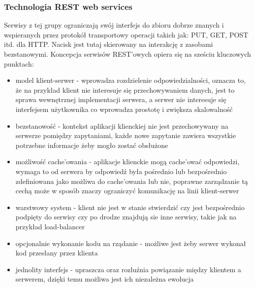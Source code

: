 \subsubsection{Technologia REST web services}
Serwisy z tej grupy \cite{fielding2000} ograniczają swój interfejs do zbioru dobrze znanych i wspieranych przez protokół transportowy operacji takich jak: PUT, GET, POST itd. dla  HTTP. Nacisk jest tutaj skierowany na interakcję z zasobami bezstanowymi. Koncepcja serwisów REST'owych opiera się na sześciu kluczowych punktach:
\begin{itemize}
	\item model klient-serwer - wprowadza rozdzielenie odpowiedzialności, oznacza to, że na przykład klient nie interesuje się przechowywaniem danych, jest to sprawa wewnętrznej implementacji serwera, a serwer nie interesuje się interfejsem użytkownika co wprowadza prostotę i zwiększa skalowalność
	\item bezstanowość - kontekst aplikacji klienckiej nie jest przechowywany na serwerze pomiędzy zapytaniami, każde nowe zapytanie zawiera wszystkie potrzebne informacje żeby mogło zostać obsłużone
	\item możliwość cache'owania - aplikacje klienckie mogą cache'ować odpowiedzi, wymaga to od serwera by odpowiedź była pośrednio lub bezpośrednio zdefiniowana jako możliwa do cache'owania lub nie, poprawne zarządzanie tą cechą może w sposób znaczy ograniczyć komunikację na linii klient-serwer
	\item warstwowy system - klient nie jest w stanie stwierdzić czy jest bezpośrednio podpięty do serwisy czy po drodze znajdują sie inne serwisy, takie jak na przykład load-balancer
	\item opcjonalnie wykonanie kodu na rządanie - możliwe jest żeby serwer wykonał kod przesłany przez klienta
	\item jednolity interfejs - upraszcza oraz rozluźnia powiązanie między klientem a serwerem, dzięki temu możliwa jest ich niezależna ewolucja
\end{itemize}   
